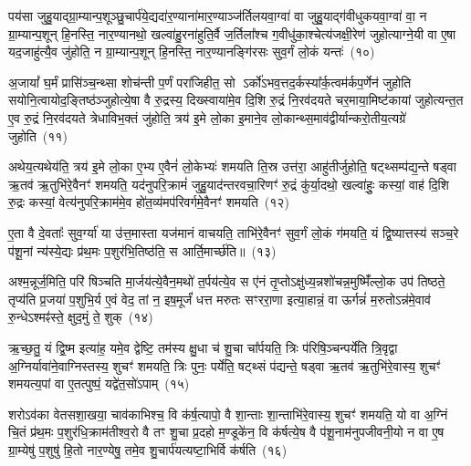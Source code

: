 पय॑सा जुहु॒याद्ग्रा॒म्यान्प॒शूञ्छु॒चार्प॑ये॒द्यदा॑र॒ण्याना॑मार॒ण्याञ्ज॑र्तिलयवा॒ग्वा॑ वा जुहु॒याद्ग॑वीधुकयवा॒ग्वा॑ वा॒ न ग्रा॒म्यान्प॒शून् हि॒नस्ति॒ नार॒ण्यानथो॒ खल्वा॑हु॒रना॑हुति॒र्वै ज॒र्तिला᳚श्च ग॒वीधु॑का॒श्चेत्य॑जक्षी॒रेण॑ जुहोत्याग्ने॒यी वा ए॒षा यद॒जाहु॑त्यै॒व जु॑होति॒ न ग्रा॒म्यान्प॒शून् हि॒नस्ति॒ नार॒ण्यानङ्गि॑रसः सुव॒र्गं लो॒कं यन्तः॑~(१०)

अ॒जायां᳚ घ॒र्मं प्रासि॑ञ्च॒न्थ्सा शोच॑न्ती प॒र्णं परा॑जिहीत॒ सो \-ऽर्को॑\-ऽभव॒त्तद॒र्कस्या᳚र्क॒त्वम॑र्कप॒र्णेन॑ जुहोति सयोनि॒त्वायोद॒ङ्तिष्ठ॑ञ्जुहोत्ये॒षा वै रु॒द्रस्य॒ दिख्स्वाया॑मे॒व दि॒शि रु॒द्रं नि॒रव॑दयते चर॒माया॒मिष्ट॑कायां जुहोत्यन्त॒त ए॒व रु॒द्रं नि॒रव॑दयते त्रेधाविभ॒क्तं जु॑होति॒ त्रय॑ इ॒मे लो॒का इ॒माने॒व लो॒कान्थ्स॒माव॑द्वीर्यान्करो॒तीय॒त्यग्रे॑ जुहोति~(११)

अथेय॒त्यथेय॑ति॒ त्रय॑ इ॒मे लो॒का ए॒भ्य ए॒वैनं॑ लो॒केभ्यः॑ शमयति ति॒स्र उत्त॑रा॒ आहु॑तीर्जुहोति॒ षट्थ्सम्प॑द्य॒न्ते षड्वा ऋ॒तव॑ ऋ॒तुभि॑रे॒वैनꣳ॑ शमयति॒ यद॑नुपरि॒क्रामं॑ जुहु॒याद॑न्तरवचा॒रिणꣳ॑ रु॒द्रं कु॑र्या॒दथो॒ खल्वा॑हुः॒ कस्यां॒ वाह॑ दि॒शि रु॒द्रः कस्यां॒ वेत्य॑नुपरि॒क्राम॑मे॒व हो॑त॒व्य॑मप॑रिवर्गमे॒वैनꣳ॑ शमयति~(१२)

ए॒ता वै दे॒वताः᳚ सुव॒र्ग्या॑ या उ॑त्त॒मास्ता यज॑मानं वाचयति॒ ताभि॑रे॒वैनꣳ॑ सुव॒र्गं लो॒कं ग॑मयति॒ यं द्वि॒ष्यात्तस्य॑ सञ्च॒रे प॑शू॒नां न्य॑स्ये॒द्यः प्र॑थ॒मः प॒शुर॑भि॒तिष्ठ॑ति॒ स आर्ति॒मार्च्छ॑ति॥~(१३)

{\anuvakamend[{प॒शू॒नां यन्तो\-ऽग्रे॑ जुहो॒त्यप॑रिवर्गमे॒वैनꣳ॑ शमयति त्रि॒ꣳ॒शच्च॑}]}%

अश्म॒न्नूर्ज॒मिति॒ परि॑ षिञ्चति मा॒र्जय॑त्ये॒वैन॒मथो॑ त॒र्पय॑त्ये॒व स ए॑नं तृ॒प्तो\-ऽक्षु॑ध्य॒न्नशो॑चन्न॒मुष्मिँ॑ल्लो॒क उप॑ तिष्ठते॒ तृप्य॑ति प्र॒जया॑ प॒शुभि॒र्य ए॒वं वेद॒ तां न॒ इष॒मूर्जं॑ धत्त मरुतः सꣳररा॒णा इत्या॒हान्नं॒ वा ऊर्गन्नं॑ म॒रुतो\-ऽन्न॑मे॒वाव॑ रु॒न्धे\-ऽश्मꣴ॑स्ते॒ क्षुद॒मुं ते॒ शुक्~(१४)

ऋ॒च्छ॒तु॒ यं द्वि॒ष्म इत्या॑ह॒ यमे॒व द्वेष्टि॒ तम॑स्य क्षु॒धा च॑ शु॒चा चा᳚र्पयति॒ त्रिः प॑रिषि॒ञ्चन्पर्ये॑ति त्रि॒वृद्वा अ॒ग्निर्यावा॑ने॒वाग्निस्तस्य॒ शुचꣳ॑ शमयति॒ त्रिः पुनः॒ पर्ये॑ति॒ षट्थ्सं प॑द्यन्ते॒ षड्वा ऋ॒तव॑ ऋ॒तुभि॑रे॒वास्य॒ शुचꣳ॑ शमयत्य॒पां वा ए॒तत्पुष्पं॒ यद्वे॑त॒सो॑\-ऽपाम्~(१५)

शरो\-ऽव॑का वेतसशा॒खया॒ चाव॑काभिश्च॒ वि क॑र्\mbox{}ष॒त्यापो॒ वै शा॒न्ताः शा॒न्ताभि॑रे॒वास्य॒ शुचꣳ॑ शमयति॒ यो वा अ॒ग्निं चि॒तं प्र॑थ॒मः प॒शुर॑धि॒क्राम॑तीश्व॒रो वै तꣳ शु॒चा प्र॒दहो म॒ण्डूके॑न॒ वि क॑र्\mbox{}षत्ये॒ष वै प॑शू॒नाम॑नुपजीवनी॒यो न वा ए॒ष ग्रा॒म्येषु॑ प॒शुषु॑ हि॒तो नार॒ण्येषु॒ तमे॒व शु॒चार्प॑यत्यष्टा॒भिर्वि क॑र्\mbox{}षति~(१६)

